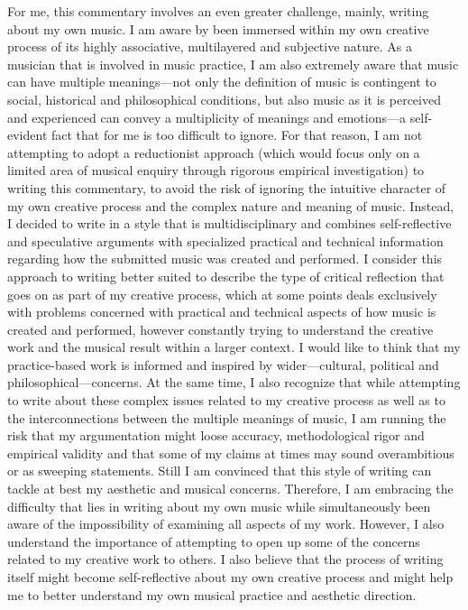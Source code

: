For me, this commentary involves an even greater challenge, mainly, writing about my own music. I am aware by been immersed within my own creative process of its highly associative, multilayered and subjective nature.  As a musician that is involved in music practice, I am also extremely aware that music can have multiple meanings---not only the definition of music is contingent to social, historical and philosophical conditions, but also music as it is perceived and experienced can convey a multiplicity of meanings and emotions---a self-evident fact that for me is too difficult to ignore. For that reason, I am not attempting to adopt a reductionist approach (which would focus only on a limited area of musical enquiry through rigorous empirical investigation) to writing this commentary, to avoid the risk of ignoring the intuitive character of my own creative process and the complex nature and meaning of music. Instead, I decided to write in a style that is multidisciplinary and combines \mbox{self-reflective} and speculative arguments with specialized practical and technical information regarding how the submitted music was created and performed. I consider this approach to writing better suited to describe the type of critical reflection that goes on as part of my creative process, which at some points deals exclusively with problems concerned with practical and technical aspects of how music is created and performed, however constantly trying to understand the creative work and the musical result within a larger context. I would like to think that my practice-based work is informed and inspired by wider---cultural, political and philosophical---concerns. At the same time, I also recognize that while attempting to write about these complex issues related to my creative process as well as to the interconnections between the multiple meanings of music, I am running the risk that my argumentation might loose accuracy, methodological rigor and empirical validity and that some of my claims at times may sound overambitious or as sweeping statements. Still I am convinced that this style of writing can tackle at best my aesthetic and musical concerns. Therefore, I am embracing the difficulty that lies in writing about my own music while simultaneously been aware of the impossibility of examining all aspects of my work. However, I also understand the importance of attempting to open up some of the concerns related to my creative work to others. I also believe that the process of writing itself might become self-reflective about my own creative process and might help me to better understand my own musical practice and aesthetic direction. 

